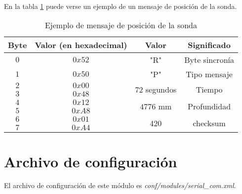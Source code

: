 En la tabla \ref{tab15} puede verse un ejemplo de un mensaje de posición de la sonda.

\begin{table}[h]
	\centering
	\caption{Ejemplo de mensaje de posición de la sonda}
	\begin{tabular}{|c|c|c|c|}\hline
		\textbf{Byte} 	&	\textbf{Valor (en hexadecimal)}	&\textbf{Valor}	&\textbf{Significado} \\ \hline \hline
		$0$ 			&  $0x52$			& "R"	& Byte sincronía	\\ \hline
		$1$				&  $0x50$			& "P"	& Tipo mensaje		\\ \hline
		$2$				&  $0x00$			& \multirow{2}{*}{$72$ segundos} & \multirow{2}{*}{Tiempo} \\
		$3$				&  $0x48$			&  & \\ \hline	
		$4$				&  $0x12$			& \multirow{2}{*}{$4776$ mm} & \multirow{2}{*}{Profundidad} \\
		$5$				&  $0xA8$			&  & \\ \hline	
		$6$				&  $0x01$			&  \multirow{2}{*}{420}	& \multirow{2}{*}{checksum} \\
		$7$				&  $0xA4$			&     &     \\ \hline	
		
		
	\end{tabular}
	\label{tab15}
\end{table}


\section{Archivo de configuración}

El archivo de configuración de este módulo es \textit{conf/modules/serial\_com.xml}.

